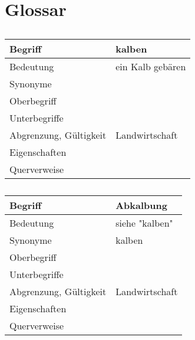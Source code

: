 \section{Glossar }

\begin{table}[h]
	\centering	
	
	\begin{tabular}{ p{4.5cm} p{10.5cm} } 
		\toprule[1pt]
		\rowcolor{maroon!30}
		
		\textbf{Begriff} &  \textbf{kalben} \\
		\midrule
		
		Bedeutung  & ein Kalb gebären \\
		Synonyme  &  \\
		Oberbegriff  &  \\
		Unterbegriffe   & \\
		Abgrenzung, Gültigkeit  & Landwirtschaft \\		
		Eigenschaften  & \\
		Querverweise  & \\
		
		\bottomrule
		
	\end{tabular}
	\label{tab: Glossareintrag zu kalben}
	\caption{}
\end{table}


\begin{table}[h]
	\centering	
	\begin{tabular}{ p{4.5cm} p{10.5cm} } 
		\toprule[1pt]
		\rowcolor{maroon!30}
		\textbf{Begriff} &  \textbf{Abkalbung}\\
		
		\midrule
		Bedeutung  & siehe "kalben" \\
		Synonyme  & kalben \\	
		Oberbegriff  &  \\
		Unterbegriffe   & \\
		Abgrenzung, Gültigkeit  & Landwirtschaft \\		
		Eigenschaften  & \\				
		Querverweise  & \\	
		\bottomrule				
		
	\end{tabular}
	\label{tab: Glossareintrag zu abkalben}
	\caption{}
\end{table}

